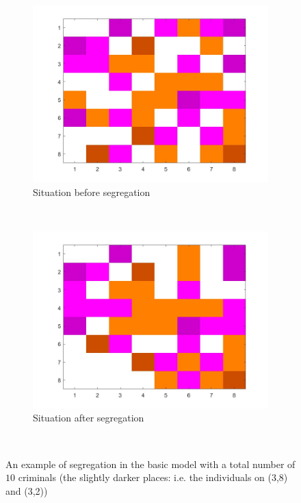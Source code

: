 \begin{figure}[H]
	\centering
    \begin{subfigure}{0.4\textwidth}
        \includegraphics[width=\textwidth]{vb5beginbord.jpg}
        \caption{Situation before segregation}
        \label{fig:example crim begin}
    \end{subfigure}\hspace{0cm}
    ~ 
    \begin{subfigure}{0.4\textwidth}
        \includegraphics[width=\textwidth]{vb5eindbord.jpg}
        \caption{Situation after segregation}
        \label{fig:example crim end}
    \end{subfigure}
    ~ 
    \caption{An example of segregation in the basic model with a total number of $10$ criminals (the slightly darker places: i.e. the individuals on (3,8) and (3,2))}
    \label{fig:examplecrim}
\end{figure}

